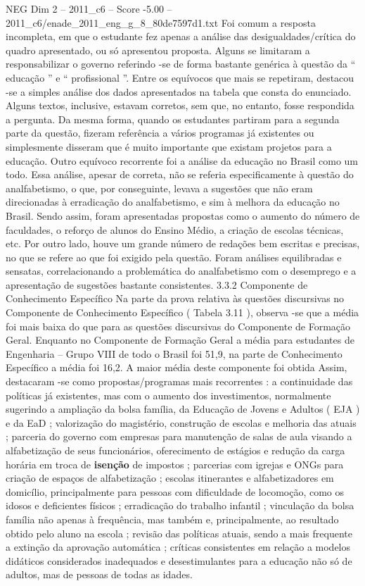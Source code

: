 \begin{textsample}{NEG Dim 2 – 2011\_c6 – Score -5.00 – 2011\_c6/enade\_2011\_eng\_g\_8\_80de7597d1.txt}
Foi comum a resposta incompleta, em que o estudante fez apenas a análise das desigualdades/crítica do quadro apresentado, ou só apresentou proposta.
Alguns se limitaram a responsabilizar o governo referindo -se de forma bastante genérica à questão da “ educação ” e “ profissional ”.
Entre os equívocos que mais se repetiram, destacou -se a simples análise dos dados apresentados na tabela que consta do enunciado.
Alguns textos, inclusive, estavam corretos, sem que, no entanto, fosse respondida a pergunta.
Da mesma forma, quando os estudantes partiram para a segunda parte da questão, fizeram referência a vários programas já existentes ou simplesmente disseram que é muito importante que existam projetos para a educação.
Outro equívoco recorrente foi a análise da educação no Brasil como um todo.
Essa análise, apesar de correta, não se referia especificamente à questão do analfabetismo, o que, por conseguinte, levava a sugestões que não eram direcionadas à erradicação do analfabetismo, e sim à melhora da educação no Brasil.
Sendo assim, foram apresentadas propostas como o aumento do número de faculdades, o reforço de alunos do Ensino Médio, a criação de escolas técnicas, etc.
Por outro lado, houve um grande número de redações bem escritas e precisas, no que se refere ao que foi exigido pela questão.
Foram análises equilibradas e sensatas, correlacionando a problemática do analfabetismo com o desemprego e a apresentação de sugestões bastante consistentes. 3.3.2 Componente de Conhecimento Específico Na parte da prova relativa às questões discursivas no Componente de Conhecimento Específico ( Tabela 3.11 ), observa -se que a média foi mais baixa do que para as questões discursivas do Componente de Formação Geral.
Enquanto no Componente de Formação Geral a média para estudantes de Engenharia – Grupo VIII de todo o Brasil foi 51,9, na parte de Conhecimento Específico a média foi 16,2.
A maior média deste componente foi obtida Assim, destacaram -se como propostas/programas mais recorrentes : a continuidade das políticas já existentes, mas com o aumento dos investimentos, normalmente sugerindo a ampliação da bolsa família, da Educação de Jovens e Adultos ( EJA ) e da EaD ; valorização do magistério, construção de escolas e melhoria das atuais ; parceria do governo com empresas para manutenção de salas de aula visando a alfabetização de seus funcionários, oferecimento de estágios e redução da carga horária em troca de \textbf{isenção} de impostos ; parcerias com igrejas e ONGs para criação de espaços de alfabetização ; escolas itinerantes e alfabetizadores em domicílio, principalmente para pessoas com dificuldade de locomoção, como os idosos e deficientes físicos ; erradicação do trabalho infantil ; vinculação da bolsa família não apenas à frequência, mas também e, principalmente, ao resultado obtido pelo aluno na escola ; revisão das políticas atuais, sendo a mais frequente a extinção da aprovação automática ; críticas consistentes em relação a modelos didáticos considerados inadequados e desestimulantes para a educação não só de adultos, mas de pessoas de todas as idades.

\end{textsample}
